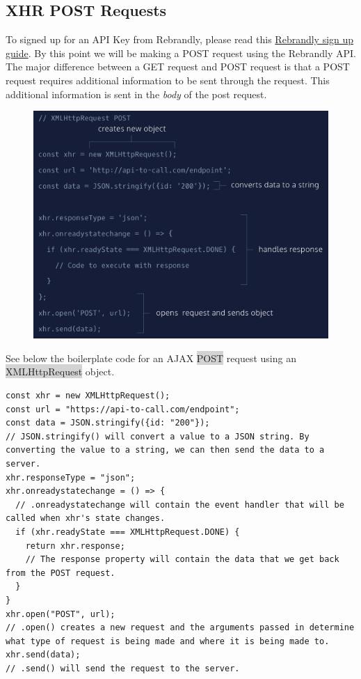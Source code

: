 \documentclass[11pt]{article}
\begin{document}
\subsection{XHR POST Requests}
To signed up for an API Key from Rebrandly, please read this \href{https://www.codecademy.com/articles/rebrandly-signup}{Rebrandly sign up guide}. By this point we will be making a POST request using the Rebrandly API. \\
\newline
The major difference between a GET request and POST request is that a POST request requires additional information to be sent through the request. This additional information is sent in the \textit{body} of the post request.
\begin{figure}[H]
\includegraphics[scale = 0.35]{17_4}
\centering
\end{figure}
See below the boilerplate code for an AJAX \colorbox{lightgray}{POST} request using an \colorbox{lightgray}{XMLHttpRequest} object.
\begin{lstlisting}
const xhr = new XMLHttpRequest(); 
const url = "https://api-to-call.com/endpoint";
const data = JSON.stringify({id: "200"});
// JSON.stringify() will convert a value to a JSON string. By converting the value to a string, we can then send the data to a server.
xhr.responseType = "json"; 
xhr.onreadystatechange = () => {
  // .onreadystatechange will contain the event handler that will be called when xhr's state changes.
  if (xhr.readyState === XMLHttpRequest.DONE) {
    return xhr.response; 
    // The response property will contain the data that we get back from the POST request.
  }
}
xhr.open("POST", url); 
// .open() creates a new request and the arguments passed in determine what type of request is being made and where it is being made to.
xhr.send(data); 
// .send() will send the request to the server.
\end{lstlisting}
\end{document}
